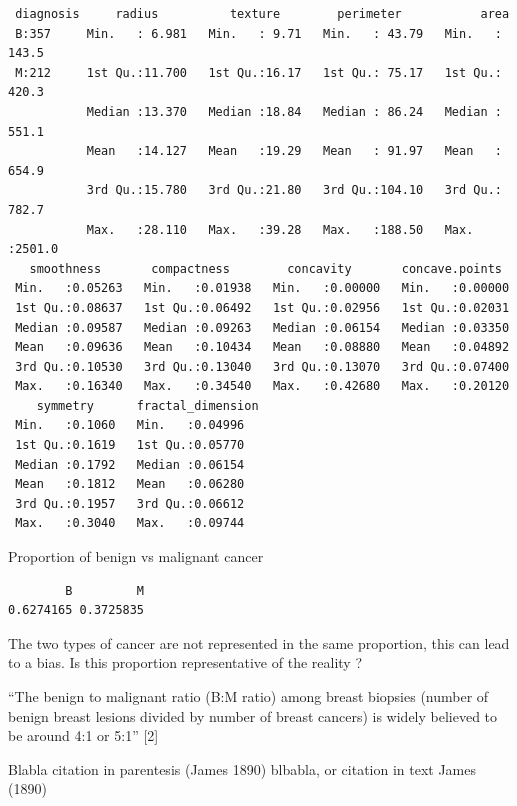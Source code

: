 \documentclass[
  11pt,
]{article}
\newenvironment{Shaded}{\begin{snugshade}}{\end{snugshade}}
\newcommand{\FunctionTok}[1]{\textcolor[rgb]{0.00,0.00,0.00}{#1}}
\newcommand{\NormalTok}[1]{#1}
\newcommand{\SpecialCharTok}[1]{\textcolor[rgb]{0.00,0.00,0.00}{#1}}
\begin{document}
\begin{verbatim}
 diagnosis     radius          texture        perimeter           area       
 B:357     Min.   : 6.981   Min.   : 9.71   Min.   : 43.79   Min.   : 143.5  
 M:212     1st Qu.:11.700   1st Qu.:16.17   1st Qu.: 75.17   1st Qu.: 420.3  
           Median :13.370   Median :18.84   Median : 86.24   Median : 551.1  
           Mean   :14.127   Mean   :19.29   Mean   : 91.97   Mean   : 654.9  
           3rd Qu.:15.780   3rd Qu.:21.80   3rd Qu.:104.10   3rd Qu.: 782.7  
           Max.   :28.110   Max.   :39.28   Max.   :188.50   Max.   :2501.0  
   smoothness       compactness        concavity       concave.points   
 Min.   :0.05263   Min.   :0.01938   Min.   :0.00000   Min.   :0.00000  
 1st Qu.:0.08637   1st Qu.:0.06492   1st Qu.:0.02956   1st Qu.:0.02031  
 Median :0.09587   Median :0.09263   Median :0.06154   Median :0.03350  
 Mean   :0.09636   Mean   :0.10434   Mean   :0.08880   Mean   :0.04892  
 3rd Qu.:0.10530   3rd Qu.:0.13040   3rd Qu.:0.13070   3rd Qu.:0.07400  
 Max.   :0.16340   Max.   :0.34540   Max.   :0.42680   Max.   :0.20120  
    symmetry      fractal_dimension
 Min.   :0.1060   Min.   :0.04996  
 1st Qu.:0.1619   1st Qu.:0.05770  
 Median :0.1792   Median :0.06154  
 Mean   :0.1812   Mean   :0.06280  
 3rd Qu.:0.1957   3rd Qu.:0.06612  
 Max.   :0.3040   Max.   :0.09744  
\end{verbatim}

Proportion of benign vs malignant cancer

\begin{Shaded}
\end{Shaded}

\begin{verbatim}
        B         M 
0.6274165 0.3725835 
\end{verbatim}

The two types of cancer are not represented in the same proportion, this
can lead to a bias. Is this proportion representative of the reality ?

``The benign to malignant ratio (B:M ratio) among breast biopsies
(number of benign breast lesions divided by number of breast cancers) is
widely believed to be around 4:1 or 5:1'' {[}2{]}

Blabla citation in parentesis (James 1890) blbabla, or citation in text
James (1890)
\end{document}

